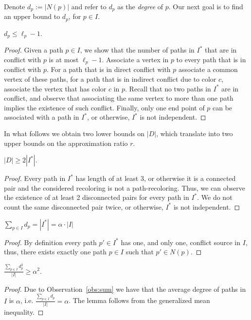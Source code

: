 Denote $d_p := |N(p)|$ and refer to $d_p$ as the \emph{degree} of $p$.
Our next goal is to find an upper bound to $d_p$, for $p \in I$.

\begin{lemma}
\label{lm:num_in_conflict}
$d_p \leq \ell_p - 1$.
\end{lemma}
\begin{proof}
Given a path $p \in I$, we show that the number of paths in $I^*$ that
are in conflict with $p$ is at most $\ell_p - 1$.
%
Associate a vertex in $p$ to every path that is in conflict with $p$.
For a path that is in direct conflict with $p$ associate a common
vertex of these paths, for a path that is in indirect conflict due to
color $c$, associate the vertex that has color $c$ in $p$.  Recall
that no two paths in $I^*$ are in conflict, and observe that
associating the same vertex to more than one path implies the
existence of such conflict. 
Finally, only one end point of $p$ can be associated with a path in $I^*$, 
or otherwise, $I^*$ is not independent.
{}\end{proof}

In what follows we obtain two lower bounds on $|D|$, which translate
into two upper bounds on the approximation ratio $r$.

\begin{lemma}
\label{lemma:kernel}
$|D| \geq 2|I^*|$.
\end{lemma}
\begin{proof}
Every path in $I^*$ has length of at least 3, or otherwise it is a
connected pair and the considered recoloring is not a path-recoloring.
Thus, we can observe the existence of at least 2 disconnected pairs
for every path in $I^*$.  We do not count the same disconnected pair
twice, or otherwise, $I^*$ is not independent.
{}\end{proof}


\begin{observation}
\label{obs:sum}
$\sum_{p \in I}{d_p} = |I^*| = \alpha \cdot |I|$
\end{observation}
\begin{proof}
By definition every path $p' \in I^*$ has one, and only one, conflict
source in $I$, thus, 
there exists exactly one path $p \in I$ such that $p' \in N(p)$.
{}\end{proof}


\begin{lemma}
\label{lm:avg_ineq}
$\frac{\sum_{p \in I}{d_p^2}}{|I|} \geq \alpha^2$.
\end{lemma}
\begin{proof}
Due to Observation~\ref{obs:sum} we have that the average degree of
paths in $I$ is $\alpha$, i.e. $\frac{\sum_{p \in I}{d_p}}{|I|}
= \alpha$.  The lemma follows from the generalized mean inequality.
{}\end{proof}


